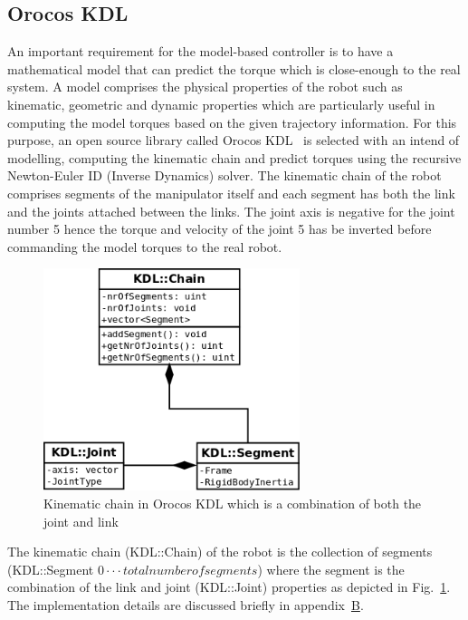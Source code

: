 \subsection*{Orocos KDL}

An important requirement for the model-based controller is to have a mathematical model that can predict the torque which is close-enough to the real system. A model comprises the physical properties of the robot such as kinematic, geometric and dynamic properties which are particularly useful in computing the model torques based on the given trajectory information. For this purpose, an open source library called Orocos KDL~\cite{smits2011kdl} is selected with an intend of modelling, computing the kinematic chain and predict torques using the recursive Newton-Euler ID (Inverse Dynamics) solver. The kinematic chain of the robot comprises segments of the manipulator itself and each segment has both the link and the joints attached between the links. The joint axis is negative for the joint number 5 hence the torque and velocity of the joint 5 has be inverted before commanding the model torques to the real robot.

\begin{figure}[h]
\centering
\includegraphics[width=75mm, trim=0 0 0 0]{pictures/kdlchain_classdiagram}
\caption{Kinematic chain in Orocos KDL which is a combination of both the joint and link}
\label{fig:kdlchain}
\end{figure}

The kinematic chain (KDL::Chain) of the robot is the collection of segments (KDL::Segment $0\cdot \cdot \cdot total number of segments$) where the segment is the combination of the link and joint (KDL::Joint) properties as depicted in Fig.~\ref{fig:kdlchain}. The implementation details are discussed briefly in appendix~\hyperref[sec:appendixB]{B}. 

